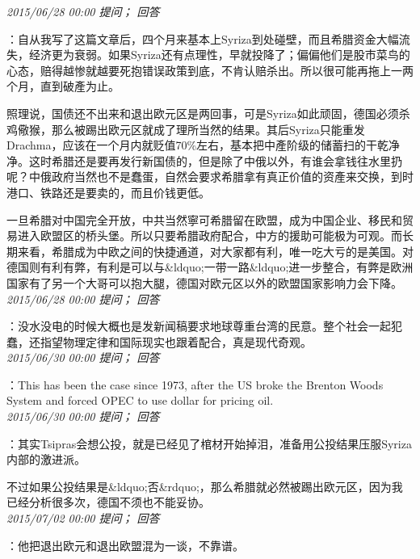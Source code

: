 \documentclass[twocolumn]{ctexart}
\begin{document}
\textit{\hfill\noindent\small 2015/06/28 00:00 提问； 回答}

：自从我写了这篇文章后，四个月来基本上Syriza到处碰壁，而且希腊资金大幅流失，经济更为衰弱。如果Syriza还有点理性，早就投降了；偏偏他们是股市菜鸟的心态，赔得越惨就越要死抱错误政策到底，不肯认赔杀出。所以很可能再拖上一两个月，直到破產为止。

照理说，国债还不出来和退出欧元区是两回事，可是Syriza如此顽固，德国必须杀鸡儆猴，那么被踢出欧元区就成了理所当然的结果。其后Syriza只能重发Drachma，应该在一个月内就贬值70\%左右，基本把中產阶级的储蓄扫的干乾净净。这时希腊还是要再发行新国债的，但是除了中俄以外，有谁会拿钱往水里扔呢？中俄政府当然也不是蠢蛋，自然会要求希腊拿有真正价值的资產来交换，到时港口、铁路还是要卖的，而且价钱更低。

一旦希腊对中国完全开放，中共当然寧可希腊留在欧盟，成为中国企业、移民和贸易进入欧盟区的桥头堡。所以只要希腊政府配合，中方的援助可能极为可观。而长期来看，希腊成为中欧之间的快捷通道，对大家都有利，唯一吃大亏的是美国。对德国则有利有弊，有利是可以与\&ldquo;一带一路\&ldquo;进一步整合，有弊是欧洲国家有了另一个大哥可以抱大腿，德国对欧元区以外的欧盟国家影响力会下降。\\

\textit{\hfill\noindent\small 2015/06/28 00:00 提问； 回答}

：没水没电的时候大概也是发新闻稿要求地球尊重台湾的民意。整个社会一起犯蠢，还指望物理定律和国际现实也跟着配合，真是现代奇观。\\

\textit{\hfill\noindent\small 2015/06/30 00:00 提问； 回答}

：This has been the case since 1973, after the US broke the Brenton Woods System and forced OPEC to use dollar for pricing oil.\\

\textit{\hfill\noindent\small 2015/06/30 00:00 提问； 回答}

：其实Tsipras会想公投，就是已经见了棺材开始掉泪，准备用公投结果压服Syriza内部的激进派。

不过如果公投结果是\&ldquo;否\&rdquo;，那么希腊就必然被踢出欧元区，因为我已经分析很多次，德国不须也不能妥协。\\

\textit{\hfill\noindent\small 2015/07/02 00:00 提问； 回答}

：他把退出欧元和退出欧盟混为一谈，不靠谱。\\
\end{document}

